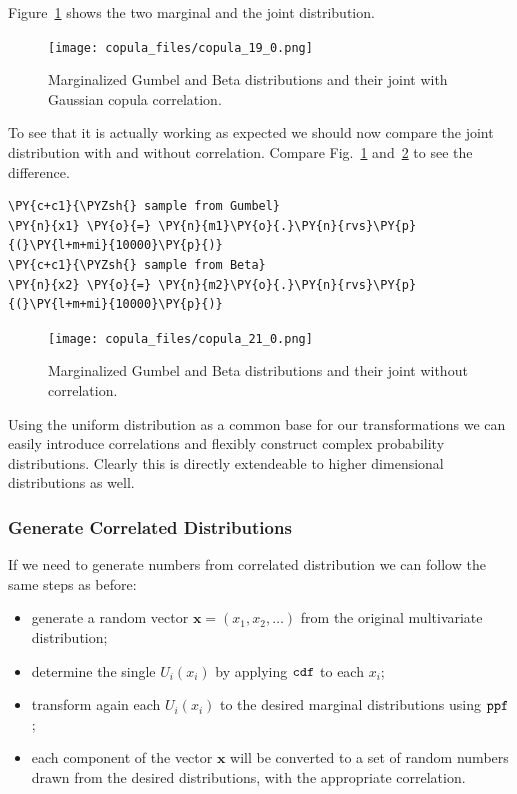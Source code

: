 Figure~\ref{fig:gumbel_beta_with_corr} shows the two marginal and the joint distribution.

\begin{figure}[htb]
  \centering
  \texttt{[image: copula\_files/copula\_19\_0.png]}
  \caption{Marginalized Gumbel and Beta distributions and their joint with Gaussian copula correlation.}
  \label{fig:gumbel_beta_with_corr}
\end{figure}
    
    To see that it is actually working as expected we should now compare the joint
    distribution with and without correlation. Compare Fig.~\ref{fig:gumbel_beta_with_corr} and~\ref{fig:gumbel_beta_without_corr} to see the
    difference.

\begin{tcolorbox}[breakable, size=fbox, boxrule=1pt, pad at break*=1mm,colback=cellbackground, colframe=cellborder]
\begin{Verbatim}[commandchars=\\\{\}]
\PY{c+c1}{\PYZsh{} sample from Gumbel}
\PY{n}{x1} \PY{o}{=} \PY{n}{m1}\PY{o}{.}\PY{n}{rvs}\PY{p}{(}\PY{l+m+mi}{10000}\PY{p}{)}
\PY{c+c1}{\PYZsh{} sample from Beta}
\PY{n}{x2} \PY{o}{=} \PY{n}{m2}\PY{o}{.}\PY{n}{rvs}\PY{p}{(}\PY{l+m+mi}{10000}\PY{p}{)}
\end{Verbatim}
\end{tcolorbox}

\begin{figure}[htb]
  \centering
  \texttt{[image: copula\_files/copula\_21\_0.png]}
  \caption{Marginalized Gumbel and Beta distributions and their joint without correlation.}
  \label{fig:gumbel_beta_without_corr}
\end{figure}
    
    Using the uniform distribution as a common base for our transformations
we can easily introduce correlations and flexibly construct complex
probability distributions. Clearly this is directly extendeable to
higher dimensional distributions as well.

\subsubsection{Generate Correlated Distributions}\label{generate-correlated-distributions}

If we need to generate numbers from correlated distribution we can
follow the same steps as before:

\begin{itemize}
\tightlist
\item
  generate a random vector \(\mathbf{x}=(x_1, x_2,\ldots)\) from the
  original multivariate distribution;
\item
  determine the single \(U_i(x_i)\) by applying \(\tt{cdf}\) to each
  \(x_i\);
\item
  transform again each \(U_i(x_i)\) to the desired marginal
  distributions using \(\tt{ppf}\);
\item
  each component of the vector \(\mathbf{x}\) will be converted to a set
  of random numbers drawn from the desired distributions, with the
  appropriate correlation.
\end{itemize}

